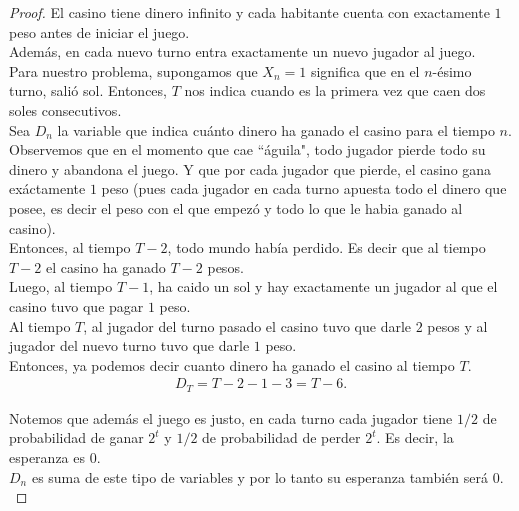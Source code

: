 \begin{proof}
		\;El casino tiene dinero infinito y cada habitante cuenta con exactamente $1$ peso antes de
		iniciar el juego.\\
	   
		Además, en cada nuevo turno entra exactamente un nuevo jugador al juego.\\
	   
		Para nuestro problema, supongamos que $X_n = 1$ significa que en el $n$-ésimo turno, salió sol.
		Entonces, $T$ nos indica cuando es la primera vez que caen dos soles consecutivos.\\
	   
		Sea $D_n$ la variable que indica cuánto dinero ha ganado el casino para el tiempo $n$.\\
	   
		Observemos que en el momento que cae ``águila", todo jugador pierde todo su dinero y abandona el juego.
		Y que por cada jugador que pierde, el casino gana exáctamente $1$ peso (pues cada jugador en cada
		turno apuesta todo el dinero que posee, es decir el peso con el que empezó y todo lo que le habia
		ganado al casino).\\
	   
		Entonces, al tiempo $T-2$, todo mundo había perdido. Es decir que al tiempo $T-2$ el casino ha ganado
		$T-2$ pesos.\\
	   
		Luego, al tiempo $T-1$, ha caido un sol y hay exactamente un jugador al que el casino tuvo 
		que pagar $1$ peso.\\
	   
		Al tiempo $T$, al jugador del turno pasado el casino tuvo que darle $2$ pesos y al jugador del nuevo
		turno tuvo que darle $1$ peso.\\
	   
		Entonces, ya podemos decir cuanto dinero ha ganado el casino al tiempo $T$.
		\begin{align}\label{problema1_3:Dinero_al_tiempo_T}
			D_T = T-2 - 1 - 3 = T - 6. 
		\end{align}					   
	   
		Notemos que además el juego es justo, en cada turno cada jugador tiene $1/2$ de probabilidad de
		ganar $2^t$ y $1/2$ de probabilidad de perder $2^t$. Es decir, la esperanza es $0$.\\
		
		$D_n$ es suma de este tipo de variables y por lo tanto su esperanza también será $0$.\\
	   

\end{proof}
